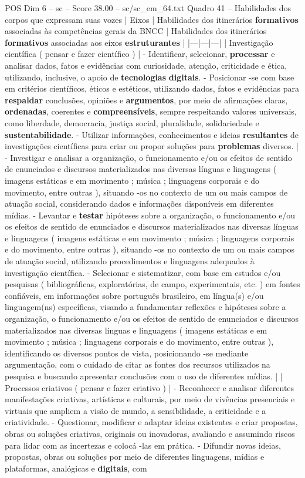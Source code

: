\begin{textsample}{POS Dim 6 – sc – Score 38.00 – sc/sc\_em\_64.txt}
Quadro 41 – Habilidades dos corpos que expressam suas vozes | Eixos | Habilidades dos itinerários \textbf{formativos} associadas às competências gerais da BNCC | Habilidades dos itinerários \textbf{formativos} associadas aos eixos \textbf{estruturantes} | |---|---|---| | Investigação científica ( pensar e fazer científico ) | - Identificar, selecionar, \textbf{processar} e analisar dados, fatos e evidências com curiosidade, atenção, criticidade e ética, utilizando, inclusive, o apoio de \textbf{tecnologias} \textbf{digitais}. - Posicionar -se com base em critérios científicos, éticos e estéticos, utilizando dados, fatos e evidências para \textbf{respaldar} conclusões, opiniões e \textbf{argumentos}, por meio de afirmações claras, \textbf{ordenadas}, coerentes e \textbf{compreensíveis}, sempre respeitando valores universais, como liberdade, democracia, justiça social, pluralidade, solidariedade e \textbf{sustentabilidade}. - Utilizar informações, conhecimentos e ideias \textbf{resultantes} de investigações científicas para criar ou propor soluções para \textbf{problemas} diversos. | - Investigar e analisar a organização, o funcionamento e/ou os efeitos de sentido de enunciados e discursos materializados nas diversas línguas e linguagens ( imagens estáticas e em movimento ; música ; linguagens corporais e do movimento, entre outras ), situando -os no contexto de um ou mais campos de atuação social, considerando dados e informações disponíveis em diferentes mídias. - Levantar e \textbf{testar} hipóteses sobre a organização, o funcionamento e/ou os efeitos de sentido de enunciados e discursos materializados nas diversas línguas e linguagens ( imagens estáticas e em movimento ; música ; linguagens corporais e do movimento, entre outras ), situando -os no contexto de um ou mais campos de atuação social, utilizando procedimentos e linguagens adequados à investigação científica. - Selecionar e sistematizar, com base em estudos e/ou pesquisas ( bibliográficas, exploratórias, de campo, experimentais, etc. ) em fontes confiáveis, em informações sobre português brasileiro, em língua(s) e/ou linguagem(ns) específicas, visando a fundamentar reflexões e hipóteses sobre a organização, o funcionamento e/ou os efeitos de sentido de enunciados e discursos materializados nas diversas línguas e linguagens ( imagens estáticas e em movimento ; música ; linguagens corporais e do movimento, entre outras ), identificando os diversos pontos de vista, posicionando -se mediante argumentação, com o cuidado de citar as fontes dos recursos utilizados na pesquisa e buscando apresentar conclusões com o uso de diferentes mídias. | | Processos criativos ( pensar e fazer criativo ) | - Reconhecer e analisar diferentes manifestações criativas, artísticas e culturais, por meio de vivências presenciais e virtuais que ampliem a visão de mundo, a sensibilidade, a criticidade e a criatividade. - Questionar, modificar e adaptar ideias existentes e criar propostas, obras ou soluções criativas, originais ou inovadoras, avaliando e assumindo riscos para lidar com as incertezas e colocá -las em prática. - Difundir novas ideias, propostas, obras ou soluções por meio de diferentes linguagens, mídias e plataformas, analógicas e \textbf{digitais}, com 
\end{textsample}
